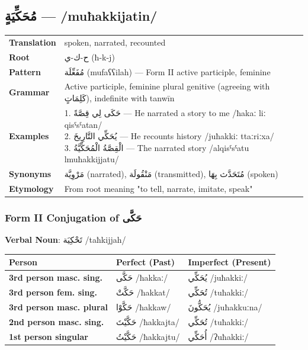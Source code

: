 \documentclass[letterpaper,12pt]{article}
\begin{document}
\subsection{\textarabic{مُحَكِّيَةٍ} — /muħakkijatin/}
\begin{tabular}{p{3cm}p{10cm}}
\toprule
\textbf{Translation} & spoken, narrated, recounted \\
\textbf{Root} & \textarabic{ح-ك-ي} (ħ-k-j) \\
\textbf{Pattern} & \textarabic{مُفَعِّلَة} (mufaʕʕilah) — Form II active participle, feminine \\
\textbf{Grammar} & Active participle, feminine plural genitive (agreeing with \textarabic{كَلِمَاتٍ}), indefinite with tanwīn \\
\midrule
\textbf{Examples} & \makecell[l]{\parbox{9.5cm}{
1. \textarabic{حَكَى لِي قِصَّةً} — He narrated a story to me /ħakaː liː qisˤsˤatan/\\
2. \textarabic{يُحَكِّي التَّارِيخَ} — He recounts history /juħakkiː ttaːriːxa/\\
3. \textarabic{الْقِصَّةُ الْمُحَكِّيَّةُ} — The narrated story /alqisˤsˤatu lmuħakkijjatu/
}} \\
\midrule
\textbf{Synonyms} & \textarabic{مَرْوِيَّة} (narrated), \textarabic{مَنْقُولَة} (transmitted), \textarabic{مُتَحَدَّث بِهَا} (spoken) \\
\textbf{Etymology} & From root meaning "to tell, narrate, imitate, speak" \\
\bottomrule
\end{tabular}

\subsubsection*{Form II Conjugation of \textarabic{حَكَّى}}
\par{\large \textbf{Verbal Noun}: \textarabic{تَحْكِيَة} /taħkijjah/}

\begin{longtable}{|>{\raggedright}p{3.5cm}|p{5cm}|p{5cm}|}
\hline
\textbf{Person} & \textbf{Perfect (Past)} & \textbf{Imperfect (Present)} \\
\hline
\textbf{3rd person masc. sing.} & \textarabic{حَكَّى} /ħakkaː/ & \textarabic{يُحَكِّي} /juħakkiː/ \\
\hline
\textbf{3rd person fem. sing.} & \textarabic{حَكَّتْ} /ħakkat/ & \textarabic{تُحَكِّي} /tuħakkiː/ \\
\hline
\textbf{3rd person masc. plural} & \textarabic{حَكَّوْا} /ħakkaw/ & \textarabic{يُحَكُّونَ} /juħakkuːna/ \\
\hline
\textbf{2nd person masc. sing.} & \textarabic{حَكَّيْتَ} /ħakkajta/ & \textarabic{تُحَكِّي} /tuħakkiː/ \\
\hline
\textbf{1st person singular} & \textarabic{حَكَّيْتُ} /ħakkajtu/ & \textarabic{أُحَكِّي} /ʔuħakkiː/ \\
\hline
\end{longtable}
\end{document}
